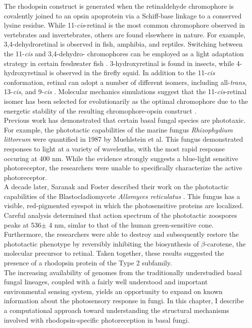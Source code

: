 \indent The rhodopsin construct is generated when the retinaldehyde chromophore is covalently joined to an opsin apoprotein via a Schiff-base linkage to a conserved lysine residue. While 11-\textit{cis}-retinal is the most common chromophore observed in vertebrates and invertebrates, others are found elsewhere in nature. For example, 3,4-dehydroretinal is observed in fish, amphibia, and reptiles. Switching between the 11-\textit{cis} and 3,4-dehydro- chromophores can be employed as a light adaptation strategy in certain freshwater fish \cite{Shichida2009}. 3-hydroxyretinal is found in insects, while 4-hydroxyretinal is observed in the firefly squid. In addition to the 11-\textit{cis} conformation, retinal can adopt a number of different isomers, including all-\textit{trans}, 13-\textit{cis}, and 9-\textit{cis} \cite{Shichida2009}. Molecular mechanics simulations suggest that the 11-\textit{cis}-retinal isomer has been selected for evolutionarily as the optimal chromophore due to the energetic stability of the resulting chromophore-opsin construct \cite{Sekharan2011}.\\ 
\indent Previous work has demonstrated that certain basal fungal species are phototaxic. For example, the phototactic capabilities of the marine fungus \textit{Rhizophydium littoreum} were quantified in 1987 by Muehlstein et al. \nocite{Muehlstein1987} This fungus demonstrated responses to light at a variety of wavelenths, with the most rapid response occuring at 400 nm. While the evidence strongly suggests a blue-light sensitive photoreceptor, the researchers were unable to specifically characterize the active photoreceptor.\\
\indent A decade later, Saranak and Foster described their work on the phototactic capabilities of the Blastocladiomycete \textit{Allomyces reticulatus} \cite{Saranak1997}. This fungus has a visible, red-pigmented eyespot in which the photosensitive proteins are localized. Careful analysis determined that action spectrum of the phototactic zoospores peaks at 536$\pm$ 4 nm, simlar to that of the human green-sensitive cone. Furthermore, the researchers were able to destroy and subsequently restore the phototactic phenotype by reversibly inhibiting the biosynthesis of $\beta$-carotene, the molecular precursor to retinal. Taken together, these results suggested the presence of a rhodopsin protein of the Type 2 subfamily.\\
\indent The increasing availability of genomes from the traditionally understudied basal fungal lineages, coupled with a fairly well understood and important environmental sensing system, yields an opportunity to expand on known information about the photosensory response in fungi. In this chapter, I describe a computational approach toward understanding the structural mechanisms involved with rhodopsin-specific photoreception in basal fungi.\\
